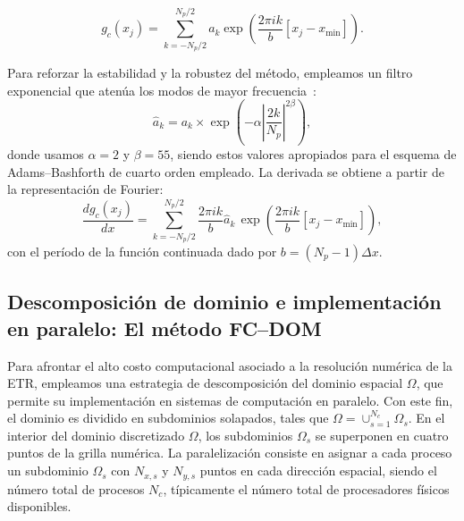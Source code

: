 \begin{equation}
g_c(x_j)=\sum_{k={-N_p/2}}^{N_p/2}a_k \exp{\left(\frac{2\pi i k}{b} [x_j-x_{\text{min}}]\right)}.
\label{eq:RTEFCSum}
\end{equation}

Para reforzar la estabilidad y la robustez del método, empleamos un filtro exponencial 
que atenúa los modos de mayor frecuencia~\cite{Albin2011}:
\begin{equation}
\hat{a}_k=a_k \times \exp \left(-\alpha \left|\frac{2k}{N_p}\right|^{2\beta}\right) ,
\label{eq:FFilter}
\end{equation}
donde usamos $\alpha=2$ y $\beta=55$, 
siendo estos valores apropiados para el esquema de Adams--Bashforth de cuarto orden empleado.
La derivada se obtiene a partir de la representación de Fourier:
\begin{equation}
\displaystyle \frac{d g_c(x_j)}{dx}=\sum_{k={-N_p/2}}^{N_p/2} \frac{2\pi i k}{b} \hat{a}_k \,  
\exp{\left(\frac{2\pi i k}{b} [x_j-x_{\text{min}}]\right)} ,
\label{eq:RTEFCSumder}
\end{equation}
con el período de la función continuada dado por $b=(N_p-1)\Delta x$.

\subsection{Descomposición de dominio e implementación en paralelo: El método FC--DOM}
\label{subsec:FC-DOM}

Para afrontar el alto costo computacional asociado a la resolución numérica de la ETR,
empleamos una estrategia de descomposición del dominio espacial $\Omega$, 
que permite su implementación en sistemas de computación en paralelo. 
 Con este fin, 
 el dominio es dividido en subdominios solapados, tales que 
 $\Omega=\cup_{s=1}^{N_{c}}\Omega_s$. 
 En el interior del dominio discretizado $\Omega$, los subdominios $\Omega_s$ se 
 superponen en cuatro puntos de la grilla numérica. 
 La paralelización consiste en asignar a cada proceso un subdominio $\Omega_s$
 con $N_{x,s}$ y $N_{y,s}$ puntos en cada dirección espacial, 
 siendo el número total de procesos $N_c$, típicamente el número 
 total de procesadores físicos disponibles.
 
